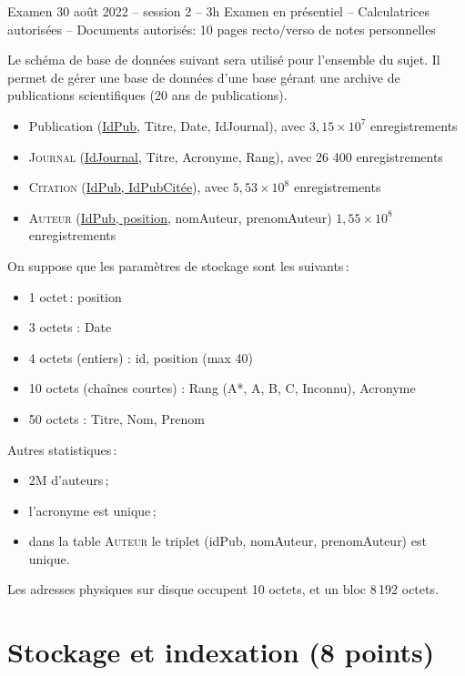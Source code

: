 %
{Examen 30 août 2022 -- session 2 -- 3h}%
{Examen en présentiel -- Calculatrices autorisées -- Documents autorisés: 10 pages recto/verso de notes personnelles}%


Le sch\'ema de base de donn\'ees suivant sera utilis\'e pour l'ensemble du
sujet. Il permet de gérer une base de données d'une base gérant une archive de publications scientifiques (20 ans de publications).

\begin{itemize}
\item {\sc Publication} (\underline{IdPub}, Titre, Date, IdJournal), avec $3,15 \times 10^7$ enregistrements
\item \textsc{Journal}  (\underline{IdJournal}, Titre, Acronyme, Rang), avec  26 400 enregistrements
\item  \textsc{Citation}  (\underline{IdPub, IdPubCitée}), avec $5,53 \times 10^8$ enregistrements
\item  \textsc{Auteur}  (\underline{IdPub, position}, nomAuteur, prenomAuteur)  $1,55 \times 10^8$ enregistrements
\end{itemize}

\smallskip

On suppose que les paramètres de stockage sont les suivants\,:
\begin{itemize}
  \item 1 octet\,: position
	\item 3 octets : Date
	\item 4 octets (entiers) : id, position (max 40)
	\item 10 octets (chaînes courtes) : Rang (A*, A, B, C, Inconnu), Acronyme
	\item 50 octets : Titre, Nom, Prenom
\end{itemize}


Autres statistiques\,:
\begin{itemize}
	\item 2M d'auteurs\,;
	\item l'acronyme est unique\,;
	\item dans la table \textsc{Auteur} le triplet (idPub, nomAuteur, prenomAuteur) est unique.
\end{itemize}

Les adresses physiques sur disque occupent 10 octets, et un bloc 8\,192 octets.

\section{Stockage et indexation (8 points)}


